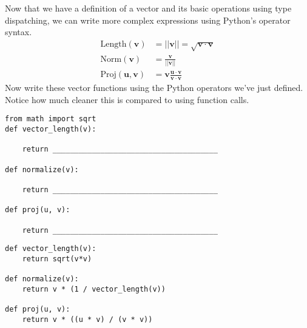 \newcommand{\ve}[1]{\ensuremath{\bm{#1}}}

\question Now that we have a definition of a vector and its basic operations
using type dispatching, we can write more complex expressions using Python's
operator syntax.
\begin{align*}
  \text{Length}(\ve{v}) &=||\ve{v}|| = \sqrt{\ve{v} \cdot \ve{v}} \\
  \text{Norm}(\ve{v}) &= \frac{\ve{v}}{||\ve{v}||} \\
  \text{Proj}(\ve{u}, \ve{v}) &= \ve{v} \frac{\ve{u} \cdot \ve{v}}{\ve{v} \cdot \ve{v}}
\end{align*}
Now write these vector functions using the Python operators we've just
defined. Notice how much cleaner this is compared to using function calls.

\begin{lstlisting}
from math import sqrt
def vector_length(v):

    return ______________________________________

def normalize(v):

    return ______________________________________

def proj(u, v):

    return ______________________________________
\end{lstlisting}
\begin{solution}
\begin{lstlisting}
def vector_length(v):
    return sqrt(v*v)

def normalize(v):
    return v * (1 / vector_length(v))

def proj(u, v):
    return v * ((u * v) / (v * v))
\end{lstlisting}
\end{solution}

